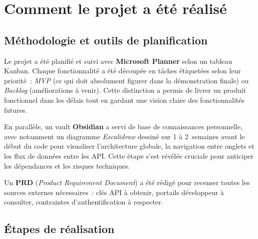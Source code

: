 \documentclass[12pt,a4paper]{article}
\begin{document}
\section{Comment le projet a été réalisé}

\subsection{Méthodologie et outils de planification}

Le projet a été planifié et suivi avec \textbf{Microsoft Planner} selon
un tableau Kanban. Chaque fonctionnalité a été découpée en tâches
étiquetées selon leur priorité~: \textit{MVP} (ce qui doit absolument
figurer dans la démonstration finale) ou \textit{Backlog} (améliorations
à venir). Cette distinction a permis de livrer un produit fonctionnel dans
les délais tout en gardant une vision claire des fonctionnalités futures.

En parallèle, un vault \textbf{Obsidian} a servi de base de connaissances
personnelle, avec notamment un diagramme \textit{Excalidraw} dessiné sur
1 à 2~semaines avant le début du code pour visualiser l'architecture
globale, la navigation entre onglets et les flux de données entre les API.
Cette étape s'est révélée cruciale pour anticiper les dépendances et les
risques techniques.

Un \textbf{PRD} (\textit{Product Requirement Document}) a été rédigé pour
recenser toutes les sources externes nécessaires~: clés API à obtenir,
portails développeur à consulter, contraintes d'authentification à
respecter.

\subsection{Étapes de réalisation}
\end{document}
